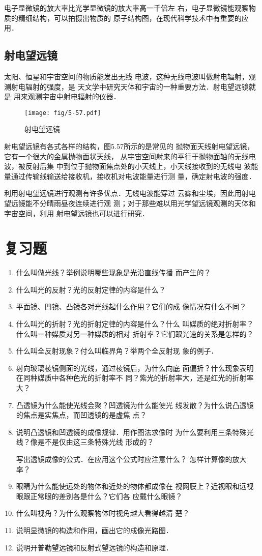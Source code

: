 电子显微镜的放大率比光学显微镜的放大率高一千倍左
右，电子显微镜能观察物质的精细结构，可以拍摄出物质的
原子结构图，在现代科学技术中有重要的应用．

\subsection*{射电望远镜}
太阳、恒星和宇宙空间的物质能发出无线
电波，这种无线电波叫做射电辐射，观测射电辐射的强度，是
天文学中研究天体和宇宙的一种重要方法．射电望远镜就是
用来观测宇宙中射电辐射的仪器．
\begin{figure}[htp]\centering
    \texttt{[image: fig/5-57.pdf]}
    \caption{射电望远镜}
    \end{figure}

射电望远镜有各式各样的结构，图5.57所示的是常见的
抛物面天线射电望远镜，它有一个很大的金属抛物面状天线，
从宇宙空间射来的平行于抛物面轴的无线电波，被反射后集
中到位于抛物面焦点处的小天线上，小天线接收到的无线电
波能量通过传输线输送给接收机，接收机对电波能量进行测
量，确定射电波的强度．

利用射电望远镜进行观测有许多优点．无线电波能穿过
云雾和尘埃，因此用射电望远镜能不分晴雨昼夜连续进行观
测；对于那些难以用光学望远镜观测的天体和字宙空间，利用
射电望远镜也可以进行研究．

\section*{复习题}
\begin{enumerate}
\item 什么叫做光线？举例说明哪些现象是光沿直线传播
而产生的？
\item 什么叫光的反射？光的反射定律的内容是什么？
\item 平面镜、凹镜、凸镜各对光线起什么作用？它们的成
像情况有什么不同？
\item 什么叫光的折射？光的折射定律的内容是什么？什么
叫媒质的绝对折射率？什么叫一种媒质对另一种媒质的相对
折射率？它们跟光速的关系是怎样的？
\item 什么叫全反射现象？付么叫临界角？举两个全反射现
象的例子．
\item 射向玻璃棱镜侧面的光线，通过棱镜后，为什么向底
面偏折？什么现象表明在同种媒质中各种色光的折射率不
同？紫光的折射率大，还是红光的折射率大？
\item 凸透镜为什么能使光线会聚？凹透镜为什么能使光
线发散？为什么说凸透镜的焦点是实焦点，而凹透镜的是虚焦
点？
\item 说明凸透镜和凹透镜的成像规律．用作图法求像时
为什么要利用三条特殊光线？像是不是仅由这三条特殊光线
形成的？

写出透镜成像的公式．在应用这个公式时应注意什么？
怎样计算像的放大率？
\item 眼睛为什么能使远处的物体和近处的物体都成像在
视网膜上？近视眼和远视眼跟正常眼的差别各是什么？它们各
应戴什么眼镜？
\item 什么叫视角？为什么观察物体时视角越大看得越清
楚？
\item 说明显微镜的构造和作用，画出它的成像光路图．
\item 说明开普勒望远镜和反射式望远镜的构造和原理．

\end{enumerate}

